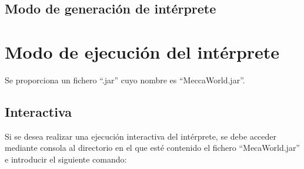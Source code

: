 \documentclass[a4paper,12pt,twoside,openright]{report}
\begin{document}
  \section{Modo de generación de intérprete}
  
\chapter{Modo de ejecución del intérprete}
  Se proporciona un fichero ``.jar'' cuyo nombre es ``MeccaWorld.jar''.
  
  \section{Interactiva}
  Si se desea realizar una ejecución interactiva del intérprete, se debe acceder mediante consola al directorio en 
  el que esté contenido el fichero ``MecaWorld.jar'' e introducir el siguiente comando:
  
\end{document}
